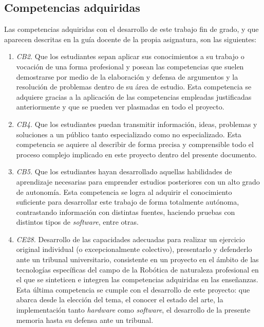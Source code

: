 \subsection{Competencias adquiridas}
\label{subsec:competenciasa}

Las competencias adquiridas con el desarrollo de este trabajo fin de grado, y que aparecen descritas en la guía docente de la propia asignatura, son las siguientes: 

\begin{enumerate}
	\item{\textit{CB2.} Que los estudiantes sepan aplicar sus conocimientos a su trabajo o vocación de una forma profesional y posean las competencias que suelen demostrarse por medio de la elaboración y defensa de argumentos y la resolución de problemas dentro de su área de estudio. 
	Esta competencia se adquiere gracias a la aplicación de las competencias empleadas justificadas anteriormente y que se pueden ver plasmadas en todo el proyecto.}
	\item{\textit{CB4.} Que los estudiantes puedan transmitir información, ideas, problemas y soluciones a un público tanto especializado como no especializado. 
	Esta competencia se aquiere al describir de forma precisa y comprensible todo el proceso complejo implicado en este proyecto dentro del presente documento.}
	\item{\textit{CB5.} Que los estudiantes hayan desarrollado aquellas habilidades de aprendizaje necesarias para emprender estudios posteriores con un alto grado de autonomía. 
	Esta competencia se logra al adquirir el conocimiento suficiente para desarrollar este trabajo de forma totalmente autónoma, contrastando información con distintas fuentes, haciendo pruebas con distintos tipos de \textit{software}, entre otras.}
	\item{\textit{CE28.} Desarrollo de las capacidades adecuadas para realizar un ejercicio original individual (o excepcionalmente colectivo), presentarlo y defenderlo ante un tribunal universitario, consistente en un proyecto en el ámbito de las tecnologías específicas del campo de la Robótica de naturaleza profesional en el que se sinteticen e integren las competencias adquiridas en las enseñanzas.
	Esta última competencia se cumple con el desarrollo de este proyecto: que abarca desde la elección del tema, el conocer el estado del arte, la implementación tanto \textit{hardware} como \textit{software}, el desarrollo de la presente memoria hasta su defensa ante un tribunal.}
\end{enumerate}


